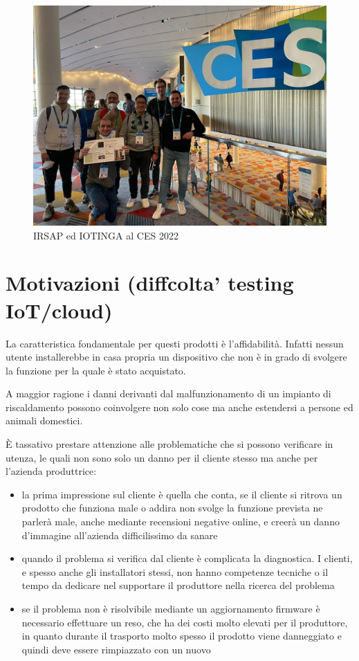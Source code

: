 \documentclass[12pt,a4paper,twoside,titlepage]{book}
\begin{document}
\begin{figure}[ht]
    \centering
    \includegraphics[width=12cm]{img/ces.jpeg}
    \caption{IRSAP ed IOTINGA al CES 2022}
    \label{fig:fig:ces}
\end{figure}

\section{Motivazioni (diffcolta' testing IoT/cloud)}

La caratteristica fondamentale per questi prodotti è l'affidabilità.
Infatti nessun utente installerebbe in casa propria un dispositivo che
non è in grado di svolgere la funzione per la quale è stato acquistato.

A maggior ragione i danni derivanti dal malfunzionamento di un impianto
di riscaldamento possono coinvolgere non solo cose ma anche estendersi
a persone ed animali domestici.

È tassativo prestare attenzione alle problematiche che si possono verificare
in utenza, le quali non sono solo un danno per il cliente stesso ma anche
per l'azienda produttrice:

\begin{itemize}
\item la prima impressione sul cliente è quella che conta, se il cliente si ritrova
    un prodotto che funziona male o addira non svolge la funzione prevista ne parlerà
    male, anche mediante recensioni negative online, e creerà un danno d'immagine all'azienda
    difficilissimo da sanare
\item quando il problema si verifica dal cliente è complicata la diagnostica. I clienti,
    e spesso anche gli installatori stessi, non hanno competenze tecniche o il
    tempo da dedicare nel supportare il produttore nella ricerca del problema
\item se il problema non è risolvibile mediante un aggiornamento firmware è necessario
    effettuare un reso, che ha dei costi molto elevati per il produttore, in quanto
    durante il trasporto molto spesso il prodotto viene danneggiato e quindi deve
    essere rimpiazzato con un nuovo
\end{itemize}
\end{document}
